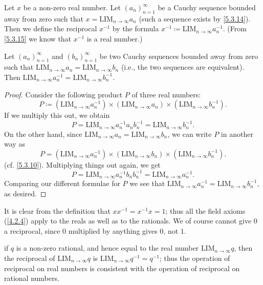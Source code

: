 \begin{definition}\label{5.3.16}
  Let \(x\) be a non-zero real number.
  Let \((a_n)_{n = 1}^{\infty}\) be a Cauchy sequence bounded away from zero such that \(x = \text{LIM}_{n \to \infty} a_n\) (such a sequence exists by \cref{5.3.14}).
  Then we define the reciprocal \(x^{-1}\) by the formula \(x^{-1} \coloneqq \text{LIM}_{n \to \infty} a_n^{-1}\).
  (From \cref{5.3.15} we know that \(x^{-1}\) is a real number.)
\end{definition}

\begin{lemma}\label{5.3.17}
  Let \((a_n)_{n = 1}^{\infty}\) and \((b_n)_{n = 1}^{\infty}\) be two Cauchy sequences bounded away from zero such that \(\text{LIM}_{n \to \infty} a_n = \text{LIM}_{n \to \infty} b_n\) (i.e., the two sequences are equivalent).
  Then \(\text{LIM}_{n \to \infty} a_n^{-1} = \text{LIM}_{n \to \infty} b_n^{-1}\).
\end{lemma}

\begin{proof}
  Consider the following product \(P\) of three real numbers:
  \[
    P \coloneqq (\text{LIM}_{n \to \infty} a_n^{-1}) \times (\text{LIM}_{n \to \infty} a_n) \times (\text{LIM}_{n \to \infty} b_n^{-1}).
  \]
  If we multiply this out, we obtain
  \[
    P = \text{LIM}_{n \to \infty} a_n^{-1} a_n b_n^{-1} = \text{LIM}_{n \to \infty} b_n^{-1}.
  \]
  On the other hand, since \(\text{LIM}_{n \to \infty} a_n = \text{LIM}_{n \to \infty} b_n\), we can write \(P\) in another way as
  \[
    P = (\text{LIM}_{n \to \infty} a_n^{-1}) \times (\text{LIM}_{n \to \infty} b_n) \times (\text{LIM}_{n \to \infty} b_n^{-1}).
  \]
  (cf. \cref{5.3.10}).
  Multiplying things out again, we get
  \[
    P = \text{LIM}_{n \to \infty} a_n^{-1} b_n b_n^{-1} = \text{LIM}_{n \to \infty} a_n^{-1}.
  \]
  Comparing our different formulae for \(P\) we see that \(\text{LIM}_{n \to \infty} a_n^{-1} = \text{LIM}_{n \to \infty} b_n^{-1}\), as desired.
\end{proof}

\begin{note}
  It is clear from the definition that \(xx^{-1} = x^{-1}x = 1\);
  thus all the field axioms (\cref{4.2.4}) apply to the reals as well as to the rationals.
  We of course cannot give \(0\) a reciprocal, since \(0\) multiplied by anything gives \(0\), not \(1\).
\end{note}

\begin{note}
  if \(q\) is a non-zero rational, and hence equal to the real number \(\text{LIM}_{n \to \infty} q\), then the reciprocal of \(\text{LIM}_{n \to \infty} q\) is \(\text{LIM}_{n \to \infty} q^{-1} = q^{-1}\);
  thus the operation of reciprocal on real numbers is consistent with the operation of reciprocal on rational numbers.
\end{note}

